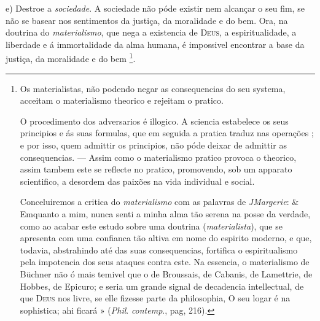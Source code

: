 e) Destroe a \emph{sociedade}. A sociedade não póde existir nem alcançar o seu fim, se não se basear nos sentimentos da justiça, da moralidade e do bem. Ora, na doutrina do \emph{materialismo},   que nega a existencia de \textsc{Deus}, a espiritualidade, a liberdade e á immortalidade da alma humana, é impossivel encontrar a base da justiça, da moralidade e do bem \footnote{Os materialistas, não podendo negar as consequencias do seu systema, acceitam o materialismo theorico e rejeitam o pratico.\par O procedimento dos adversarios é illogico. A sciencia estabelece os seus principios e ás suas formulas, que em seguida a pratica traduz nas operações ; e por isso, quem admittir os principios, não póde deixar de admittir as consequencias. --- Assim como o materialismo pratico provoca o theorico, assim tambem este se reflecte no pratico, promovendo, sob um apparato scientifico, a desordem das paixões na vida individual e social.\par Conceluiremos a critica do \emph{materialismo} com as palavras de \emph{JMargerie}: \& Emquanto a mim, nunca senti a minha alma tão serena na posse da verdade, como ao acabar este estudo sobre uma doutrina (\emph{materialista}), que se apresenta com uma confianca tão altiva em nome do espirito moderno, e que, todavia, abstrahindo até das suas consequencias, fortifica o espiritualismo pela impotencia dos seus ataques contra este. Na essencia, o materialismo de Büchner não ó mais temivel que o de Broussais, de Cabanis, de Lamettrie, de Hobbes, de Epicuro; e seria um grande signal de decadencia intellectual, de que \textsc{Deus} nos livre, se elle fizesse parte da philosophia, O seu logar é na sophistica; ahi ficará » (\emph{Phil}. \emph{contemp}., pag, 216).}.

   
